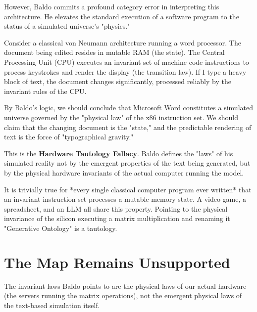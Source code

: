 \documentclass[12pt,a4paper]{article}
\begin{document}
However, Baldo commits a profound category error in interpreting this architecture. He elevates the standard execution of a software program to the status of a simulated universe's "physics."

Consider a classical von Neumann architecture running a word processor. The document being edited resides in mutable RAM (the state). The Central Processing Unit (CPU) executes an invariant set of machine code instructions to process keystrokes and render the display (the transition law). If I type a heavy block of text, the document changes significantly, processed reliably by the invariant rules of the CPU.

By Baldo's logic, we should conclude that Microsoft Word constitutes a simulated universe governed by the "physical law" of the x86 instruction set. We should claim that the changing document is the "state," and the predictable rendering of text is the force of "typographical gravity."

This is the \textbf{Hardware Tautology Fallacy}. Baldo defines the "laws" of his simulated reality not by the emergent properties of the text being generated, but by the physical hardware invariants of the actual computer running the model.

It is trivially true for *every single classical computer program ever written* that an invariant instruction set processes a mutable memory state. A video game, a spreadsheet, and an LLM all share this property. Pointing to the physical invariance of the silicon executing a matrix multiplication and renaming it "Generative Ontology" is a tautology.

\section{The Map Remains Unsupported}

The invariant laws Baldo points to are the physical laws of our actual hardware (the servers running the matrix operations), not the emergent physical laws of the text-based simulation itself.
\end{document}
